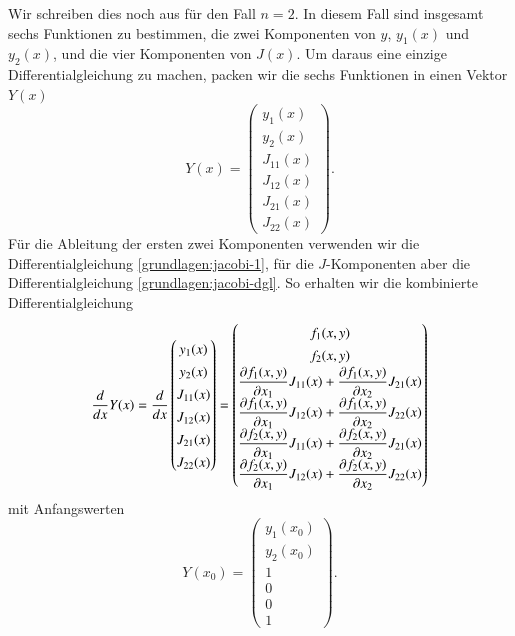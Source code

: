 Wir schreiben dies noch aus für den Fall $n=2$.
In diesem Fall sind insgesamt sechs Funktionen zu bestimmen, die
zwei Komponenten von $y$, $y_1(x)$ und $y_2(x)$, und die vier
Komponenten von $J(x)$.
Um daraus eine einzige Differentialgleichung zu machen, packen wir
die sechs Funktionen in einen Vektor $Y(x)$
\[
Y(x)=
\begin{pmatrix}
y_1(x)\\
y_2(x)\\
J_{11}(x)\\
J_{12}(x)\\
J_{21}(x)\\
J_{22}(x)
\end{pmatrix}.
\]
Für die Ableitung der ersten zwei Komponenten verwenden wir die
Differentialgleichung \eqref{grundlagen:jacobi-1}, für die $J$-Komponenten
aber die Differentialgleichung \eqref{grundlagen:jacobi-dgl}.
So erhalten wir die kombinierte Differentialgleichung
\begin{equation}
\frac{d}{dx}Y(x)
=
\frac{d}{dx}
\begin{pmatrix}
y_1(x)\\
y_2(x)\\
J_{11}(x)\\
J_{12}(x)\\
J_{21}(x)\\
J_{22}(x)
\end{pmatrix}
=
\renewcommand\arraystretch{1.35}
\begin{pmatrix}
f_1(x,y)\\
f_2(x,y)\\
\displaystyle
\frac{\partial f_1(x,y)}{\partial x_1} J_{11}(x)
	+\frac{\partial f_1(x,y)}{\partial x_2} J_{21}(x)\\
\displaystyle
\frac{\partial f_1(x,y)}{\partial x_1} J_{12}(x)
	+\frac{\partial f_1(x,y)}{\partial x_2} J_{22}(x)\\
\displaystyle
\frac{\partial f_2(x,y)}{\partial x_1} J_{11}(x)
	+\frac{\partial f_2(x,y)}{\partial x_2} J_{21}(x)\\
\displaystyle
\frac{\partial f_2(x,y)}{\partial x_1} J_{12}(x)
	+\frac{\partial f_2(x,y)}{\partial x_2} J_{22}(x)\\
\end{pmatrix}
\end{equation}
mit Anfangswerten
\begin{equation}
Y(x_0)
=
\begin{pmatrix}
y_1(x_0)\\y_2(x_0)\\
1\\0\\0\\1
\end{pmatrix}.
\end{equation}

